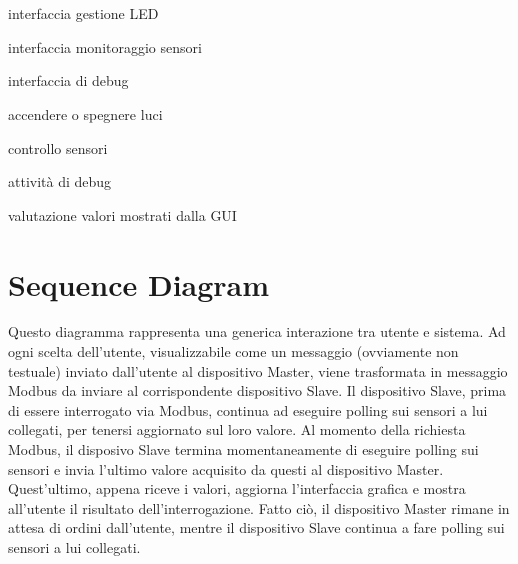 \documentclass[a4paper,titlepage]{book}
\begin{document}
~

~

\begin{usecase}
  	{\item interfaccia gestione LED
                             	\item interfaccia monitoraggio sensori
				\item interfaccia di debug}

  	{\item accendere o spegnere luci
                             	\item controllo sensori
				\item attività di debug}

  	{\item valutazione valori mostrati dalla GUI}

\end{usecase}



\newpage

\section{Sequence Diagram}

Questo diagramma rappresenta una generica interazione tra utente e sistema. Ad ogni scelta dell'utente, visualizzabile come un messaggio (ovviamente non testuale) inviato dall'utente al dispositivo Master, viene trasformata in messaggio Modbus da inviare al corrispondente dispositivo Slave. Il dispositivo Slave, prima di essere interrogato via Modbus, continua ad eseguire polling sui sensori a lui collegati, per tenersi aggiornato sul loro valore. Al momento della richiesta Modbus, il disposivo Slave termina momentaneamente di eseguire polling sui sensori e invia l'ultimo valore acquisito da questi al dispositivo Master. Quest'ultimo, appena riceve i valori, aggiorna l'interfaccia grafica e mostra all'utente il risultato dell'interrogazione. Fatto ciò, il dispositivo Master rimane in attesa di ordini dall'utente, mentre il dispositivo Slave continua a fare polling sui sensori a lui collegati.
\end{document}
